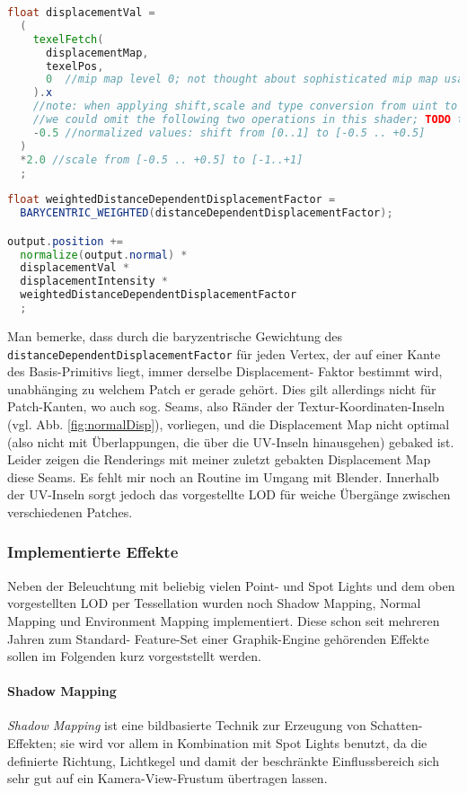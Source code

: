 	\begin{lstlisting}[language=GLSL]  
float displacementVal = 
  (
    texelFetch(
      displacementMap, 
      texelPos,
      0  //mip map level 0; not thought about sophisticated mip map usage in this context yet
    ).x 
    //note: when applying shift,scale and type conversion from uint to int on the texture values and setting the texture parameters accordingly,
    //we could omit the following two operations in this shader; TODO test it
    -0.5 //normalized values: shift from [0..1] to [-0.5 .. +0.5]
  )
  *2.0 //scale from [-0.5 .. +0.5] to [-1..+1]
  ;
        
float weightedDistanceDependentDisplacementFactor = 
  BARYCENTRIC_WEIGHTED(distanceDependentDisplacementFactor);         

output.position +=  
  normalize(output.normal) * 
  displacementVal *
  displacementIntensity * 
  weightedDistanceDependentDisplacementFactor
  ;
	\end{lstlisting}
	Man bemerke, dass durch die baryzentrische Gewichtung des \linebreak \lstinline|distanceDependentDisplacementFactor|
	für jeden Vertex, der auf einer Kante des Basis-Primitivs liegt, immer derselbe Displacement- Faktor bestimmt wird, 
	unabhänging zu welchem Patch er gerade gehört. Dies gilt allerdings nicht für Patch-Kanten, wo auch
	sog. Seams, also Ränder der Textur-Koordinaten-Inseln (vgl. Abb. \ref{fig:normalDisp}), vorliegen, und die Displacement
	Map nicht optimal (also nicht mit Überlappungen, die über die UV-Inseln hinausgehen) gebaked ist.
	Leider zeigen die Renderings mit meiner zuletzt gebakten Displacement Map diese Seams. 
	Es fehlt mir noch an Routine im Umgang mit Blender.
	Innerhalb der UV-Inseln sorgt jedoch das vorgestellte LOD für weiche Übergänge zwischen verschiedenen Patches.

	
\subsubsection{Implementierte Effekte}
	\label{sec:genericVisualEffects}
	Neben der Beleuchtung mit beliebig vielen Point- und Spot Lights und dem oben vorgestellten LOD per Tessellation
	wurden noch Shadow Mapping, Normal Mapping und Environment Mapping implementiert. 
	Diese schon seit mehreren Jahren zum Standard- Feature-Set einer Graphik-Engine gehörenden Effekte
	sollen im Folgenden kurz vorgeststellt werden.
	

	\paragraph{Shadow Mapping}
	\emph{Shadow Mapping} ist eine bildbasierte Technik zur Erzeugung von Schatten-Effekten; sie wird vor
	allem in Kombination mit Spot Lights benutzt, da die definierte Richtung, Lichtkegel und damit
	der beschränkte Einflussbereich sich sehr gut auf ein Kamera-View-Frustum übertragen lassen.
	
